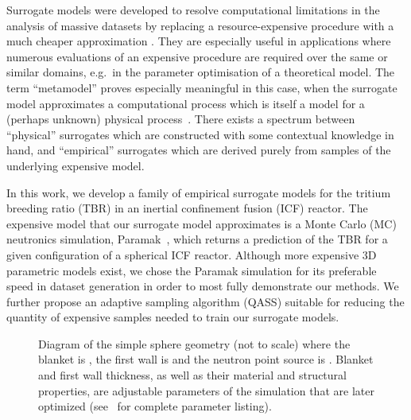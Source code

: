 Surrogate models were developed to resolve computational limitations in the analysis of massive datasets by replacing a resource-expensive procedure with a much cheaper approximation
\cite{Sondergaard2003}. They are especially useful in applications where
numerous evaluations of an expensive procedure are required over the same or
similar domains, e.g.~in the parameter optimisation of a theoretical model. The
term ``metamodel'' proves especially meaningful in this case, when the surrogate
model approximates a computational process which is itself a model for a
(perhaps unknown) physical process~\cite{Myers2002}. There exists a spectrum
between ``physical'' surrogates which are constructed with some contextual
knowledge in hand, and ``empirical'' surrogates which are derived purely from
samples of the underlying expensive model.

In this work, we develop a family of empirical surrogate models for the tritium breeding
ratio (TBR) in an inertial confinement fusion (ICF) reactor. The expensive model
that our surrogate model approximates is a Monte Carlo (MC) neutronics
simulation, Paramak~\cite{paramak}, which returns a prediction of the TBR for a given
configuration of a spherical ICF reactor. Although more expensive 3D parametric models exist, we chose the Paramak simulation for its preferable speed in dataset generation in order to most fully demonstrate our methods. We further propose an adaptive sampling algorithm (QASS) suitable for reducing the quantity of expensive samples needed to train our surrogate models.

\begin{figure}[!ht]
  \centering

    \caption{Diagram of the simple sphere geometry (not to scale) where the
	blanket is , the
first wall is  and the
neutron point source is .
Blanket and first wall thickness, as well as their material and structural
properties, are adjustable parameters of the simulation that are later optimized
(see~ for complete parameter listing).}
    \label{fig:model_diagram}
\end{figure}

